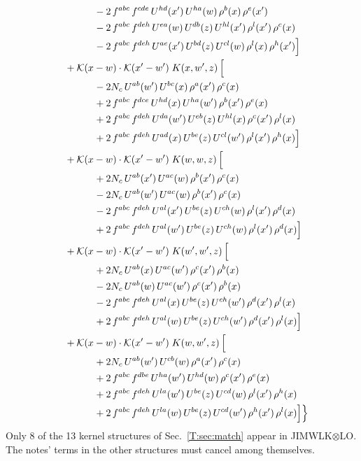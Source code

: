 \documentclass[10pt]{article}
\numberwithin{equation}{section}
\newcommand{\KK}{\mathcal K}
\begin{document}
\begin{align}
&\qquad\qquad -2\,f^{abc}\,f^{cde}\,U^{hd}(x')\,U^{ha}(w)\,\rho^{b}(x)\,\rho^{e}(x')\notag\\
&\qquad\qquad -2\,f^{abc}\,f^{deh}\,U^{ea}(w)\,U^{db}(z)\,U^{hl}(x')\,\rho^{l}(x')\,\rho^{c}(x)\notag\\
&\qquad\qquad -2\,f^{abc}\,f^{deh}\,U^{ae}(x')\,U^{bd}(z)\,U^{cl}(w)\,\rho^{l}(x)\,\rho^{h}(x')\Big]\notag\\
&\quad +\KK(x-w)\cdot\KK(x'-w')\;K(x,w',z)\,\Big[\notag\\
&\qquad\qquad - 2 N_c\,U^{ab}(w')\,U^{bc}(x)\,\rho^{a}(x')\,\rho^{c}(x)\notag\\
&\qquad\qquad +2\,f^{abc}\,f^{dce}\,U^{hd}(x)\,U^{ha}(w')\,\rho^{b}(x')\,\rho^{e}(x)\notag\\
&\qquad\qquad +2\,f^{abc}\,f^{deh}\,U^{da}(w')\,U^{eb}(z)\,U^{hl}(x)\,\rho^{c}(x')\,\rho^{l}(x)\notag\\
&\qquad\qquad +2\,f^{abc}\,f^{deh}\,U^{ad}(x)\,U^{be}(z)\,U^{cl}(w')\,\rho^{l}(x')\,\rho^{h}(x)\Big]\notag\\
&\quad +\KK(x-w)\cdot\KK(x'-w')\;K(w,w,z)\,\Big[\notag\\
&\qquad\qquad +2 N_c\,U^{ab}(x')\,U^{ac}(w)\,\rho^{b}(x')\,\rho^{c}(x)\notag\\
&\qquad\qquad - 2 N_c\,U^{ab}(w')\,U^{ac}(w)\,\rho^{b}(x')\,\rho^{c}(x)\notag\\
&\qquad\qquad -2\,f^{abc}\,f^{deh}\,U^{al}(x')\,U^{be}(z)\,U^{ch}(w)\,\rho^{l}(x')\,\rho^{d}(x)\notag\\
&\qquad\qquad +2\,f^{abc}\,f^{deh}\,U^{al}(w')\,U^{be}(z)\,U^{ch}(w)\,\rho^{l}(x')\,\rho^{d}(x)\Big]\notag\\
&\quad +\KK(x-w)\cdot\KK(x'-w')\;K(w',w',z)\,\Big[\notag\\
&\qquad\qquad +2 N_c\,U^{ab}(x)\,U^{ac}(w')\,\rho^{c}(x')\,\rho^{b}(x)\notag\\
&\qquad\qquad - 2 N_c\,U^{ab}(w)\,U^{ac}(w')\,\rho^{c}(x')\,\rho^{b}(x)\notag\\
&\qquad\qquad -2\,f^{abc}\,f^{deh}\,U^{al}(x)\,U^{be}(z)\,U^{ch}(w')\,\rho^{d}(x')\,\rho^{l}(x)\notag\\
&\qquad\qquad +2\,f^{abc}\,f^{deh}\,U^{al}(w)\,U^{be}(z)\,U^{ch}(w')\,\rho^{d}(x')\,\rho^{l}(x)\Big]\notag\\
&\quad +\KK(x-w)\cdot\KK(x'-w')\;K(w,w',z)\,\Big[\notag\\
&\qquad\qquad +2 N_c\,U^{ab}(w')\,U^{cb}(w)\,\rho^{a}(x')\,\rho^{c}(x)\notag\\
&\qquad\qquad +2\,f^{abc}\,f^{dbe}\,U^{ha}(w')\,U^{hd}(w)\,\rho^{c}(x')\,\rho^{e}(x)\notag\\
&\qquad\qquad +2\,f^{abc}\,f^{deh}\,U^{la}(w')\,U^{be}(z)\,U^{cd}(w)\,\rho^{l}(x')\,\rho^{h}(x)\notag\\
&\qquad\qquad +2\,f^{abc}\,f^{deh}\,U^{la}(w)\,U^{be}(z)\,U^{cd}(w')\,\rho^{h}(x')\,\rho^{l}(x)\Big]\Big\}\label{T:eq:Jdecomp}
\end{align}
Only 8 of the 13 kernel structures of Sec.~\ref{T:sec:match} appear in JIMWLK$\otimes$LO. The notes' terms in the other structures must cancel among themselves.
\end{document}
